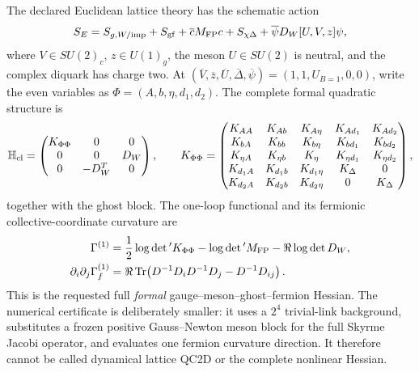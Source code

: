\documentclass[11pt]{article}
\numberwithin{equation}{section}
\newcommand{\Tr}{\operatorname{Tr}}
\begin{document}
The declared Euclidean lattice theory has the schematic action
\begin{equation}
 S_E=S_{g,W/{\rm imp}}+S_{\rm gf}+\overline cM_{\rm FP}c
 +S_{\chi\Delta}+\overline\psi D_W[U,V,z]\psi ,
 \label{eq:frontier-lattice-action}
\end{equation}
where \(V\in SU(2)_c\), \(z\in U(1)_g\), the meson \(U\in SU(2)\) is
neutral, and the complex diquark has charge two.  At
\((\overline V,\overline z,\overline U,\overline\Delta,\overline\psi)
=(1,1,U_{B=1},0,0)\), write the even variables as
\(\Phi=(A,b,\eta,d_1,d_2)\).  The complete formal quadratic structure is
\begin{equation}
 \mathbb H_{\rm cl}=
 \begin{pmatrix}
 K_{\Phi\Phi}&0&0\\
 0&0&D_W\\
 0&-D_W^T&0
 \end{pmatrix},
 \qquad
 K_{\Phi\Phi}=
 \begin{pmatrix}
 K_{AA}&K_{Ab}&K_{A\eta}&K_{Ad_1}&K_{Ad_2}\\
 K_{bA}&K_{bb}&K_{b\eta}&K_{bd_1}&K_{bd_2}\\
 K_{\eta A}&K_{\eta b}&K_\eta&K_{\eta d_1}&K_{\eta d_2}\\
 K_{d_1A}&K_{d_1b}&K_{d_1\eta}&K_\Delta&0\\
 K_{d_2A}&K_{d_2b}&K_{d_2\eta}&0&K_\Delta
 \end{pmatrix},
 \label{eq:frontier-super-hessian}
\end{equation}
together with the ghost block.  The one-loop functional and its fermionic
collective-coordinate curvature are
\begin{align}
 \Gamma^{(1)}
 &=\frac12\log\det{}'K_{\Phi\Phi}
   -\log\det{}'M_{\rm FP}-\Re\log\det D_W,
 \label{eq:frontier-one-loop}\\
 \partial_i\partial_j\Gamma_f^{(1)}
 &=\Re\Tr\!\left(
 D^{-1}D_iD^{-1}D_j-D^{-1}D_{ij}\right).
 \label{eq:frontier-logdet-curvature}
\end{align}
This is the requested full \emph{formal} gauge--meson--ghost--fermion
Hessian.  The numerical certificate is deliberately smaller: it uses a
\(2^4\) trivial-link background, substitutes a frozen positive
Gauss--Newton meson block for the full Skyrme Jacobi operator, and evaluates
one fermion curvature direction.  It therefore cannot be called dynamical
lattice QC2D or the complete nonlinear Hessian.
\end{document}
